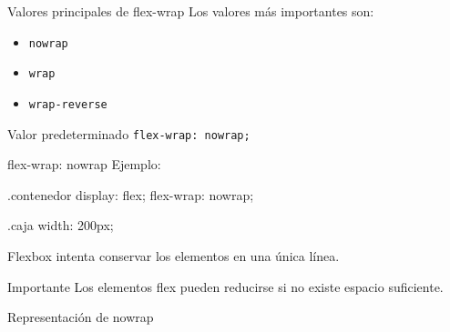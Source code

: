 \documentclass[aspectratio=169,11.5pt]{beamer}
\begin{document}
    \begin{frame}{Valores principales de flex-wrap}
        Los valores más importantes son:

        \begin{itemize}
            \item \texttt{nowrap}
            \item \texttt{wrap}
            \item \texttt{wrap-reverse}
        \end{itemize}

        \begin{block}{Valor predeterminado}
            \texttt{flex-wrap: nowrap;}
        \end{block}
    \end{frame}

    \begin{frame}[fragile]{flex-wrap: nowrap}
        Ejemplo:

        \begin{csscodedark}
            .contenedor {
                display: flex;
                flex-wrap: nowrap;
            }

            .caja {
                width: 200px;
            }
        \end{csscodedark}

        Flexbox intenta conservar los elementos
        en una única línea.

        \begin{alertblock}{Importante}
            Los elementos flex pueden reducirse
            si no existe espacio suficiente.
        \end{alertblock}
    \end{frame}

    \begin{frame}{Representación de nowrap}
        \begin{center}
        \end{center}
    \end{frame}
\end{document}
